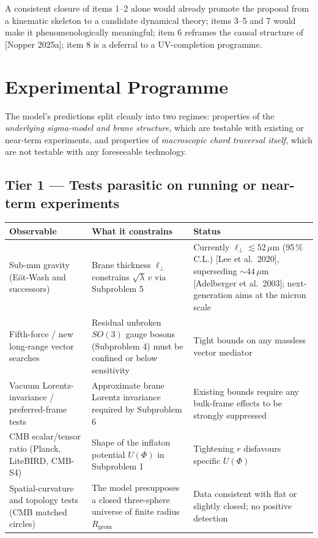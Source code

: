 \documentclass[11pt,a4paper]{article}
\newcommand{\Rgeom}{R_{\mathrm{geom}}}
\begin{document}
A consistent closure of items 1--2 alone would already promote the proposal from a kinematic skeleton to a candidate dynamical theory; items 3--5 and 7 would make it phenomenologically meaningful; item 6 reframes the causal structure of [Nopper 2025a]; item 8 is a deferral to a UV-completion programme.

\section{Experimental Programme}
\label{sec:experiment}

The model's predictions split cleanly into two regimes: properties of the \emph{underlying sigma-model and brane structure}, which are testable with existing or near-term experiments, and properties of \emph{macroscopic chord traversal itself}, which are not testable with any foreseeable technology.

\subsection{Tier 1 --- Tests parasitic on running or near-term experiments}

\begin{table}[H]
\centering
\small
\begin{tabularx}{\linewidth}{@{}p{4.2cm}XX@{}}
\toprule
Observable & What it constrains & Status \\
\midrule
Sub-mm gravity (E\"ot-Wash and successors) & Brane thickness $\ell_\perp$ constrains $\sqrt{\lambda}\,v$ via Subproblem 5 & Currently $\ell_\perp\lesssim 52\,\mu\mathrm{m}$ (95\,\% C.L.) [Lee et al.\ 2020], superseding $\sim 44\,\mu\mathrm{m}$ [Adelberger et al.\ 2003]; next-generation aims at the micron scale \\
Fifth-force / new long-range vector searches & Residual unbroken $SO(3)$ gauge bosons (Subproblem 4) must be confined or below sensitivity & Tight bounds on any massless vector mediator \\
Vacuum Lorentz-invariance / preferred-frame tests & Approximate brane Lorentz invariance required by Subproblem 6 & Existing bounds require any bulk-frame effects to be strongly suppressed \\
CMB scalar/tensor ratio (Planck, LiteBIRD, CMB-S4) & Shape of the inflaton potential $U(\Phi)$ in Subproblem 1 & Tightening $r$ disfavours specific $U(\Phi)$ \\
Spatial-curvature and topology tests (CMB matched circles) & The model presupposes a closed three-sphere universe of finite radius $\Rgeom$ & Data consistent with flat or slightly closed; no positive detection \\
\bottomrule
\end{tabularx}
\end{table}
\end{document}
